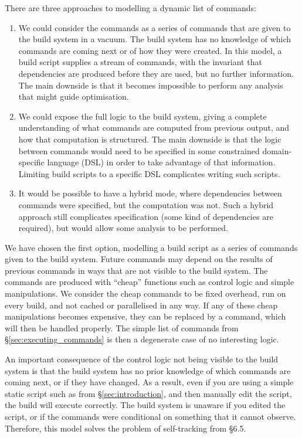 There are three approaches to modelling a dynamic list of commands:

\begin{enumerate}
\item We could consider the commands as a series of commands that are given to the build system in a vacuum. The build system has no knowledge of which commands are coming next or of how they were created. In this model, a build script supplies a stream of commands, with the invariant that dependencies are produced before they are used, but no further information. The main downside is that it becomes impossible to perform any analysis that might guide optimisation.
\item We could expose the full logic to the build system, giving a complete understanding of what commands are computed from previous output, and how that computation is structured. The main downside is that the logic between commands would need to be specified in some constrained domain-specific language (DSL) in order to take advantage of that information. Limiting build scripts to a specific DSL complicates writing such scripts.
\item It would be possible to have a hybrid mode, where dependencies between commands were specified, but the computation was not. Such a hybrid approach still complicates specification (some kind of dependencies are required), but would allow some analysis to be performed.
\end{enumerate}

We have chosen the first option, modelling a build script as a series of commands given to the build system. Future commands may depend on the results of previous commands in ways that are not visible to the build system. The commands are produced with ``cheap'' functions such as control logic and simple manipulations. We consider the cheap commands to be fixed overhead, run on every build, and not cached or parallelised in any way. If any of these cheap manipulations becomes expensive, they can be replaced by a command, which will then be handled properly. The simple list of commands from \S\ref{sec:executing_commands} is then a degenerate case of no interesting logic.

An important consequence of the control logic not being visible to the build system is that the build system has no prior knowledge of which commands are coming next, or if they have changed. As a result, even if you are using a simple static script such as from \S\ref{sec:introduction}, and then manually edit the script, the build will execute correctly. The build system is unaware if you edited the script, or if the commands were conditional on something that it cannot observe. Therefore, this model solves the problem of self-tracking from \citet{build_systems_a_la_carte} \S6.5.

